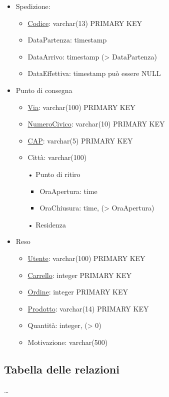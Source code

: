\documentclass[11pt]{article}
\begin{document}
\begin{itemize}
    \item Spedizione:
    \begin{itemize}
        \item \underline{Codice}: varchar(13) PRIMARY KEY
        \item DataPartenza: timestamp
        \item DataArrivo: timestamp (\textgreater{} DataPartenza)
        \item DataEffettiva: timestamp può essere NULL
    \end{itemize}
    \item Punto di consegna
    \begin{itemize}
        \item \underline{Via}: varchar(100) PRIMARY KEY
        \item \underline{NumeroCivico}: varchar(10) PRIMARY KEY
        \item \underline{CAP}: varchar(5) PRIMARY KEY
        \item Città: varchar(100)
        \item[•] Punto di ritiro
        \begin{itemize}
            \item OraApertura: time
            \item OraChiusura: time, (\textgreater{} OraApertura)
        \end{itemize}
        \item[•] Residenza
    \end{itemize}
    \item Reso
    \begin{itemize}
        \item \underline{Utente}: varchar(100) PRIMARY KEY
        \item \underline{Carrello}: integer PRIMARY KEY
        \item \underline{Ordine}: integer PRIMARY KEY
        \item \underline{Prodotto}: varchar(14) PRIMARY KEY
        \item Quantità: integer, (\textgreater{} 0)
        \item Motivazione: varchar(500)
    \end{itemize}
\end{itemize}

\subsection{Tabella delle relazioni}

\dots
\end{document}
